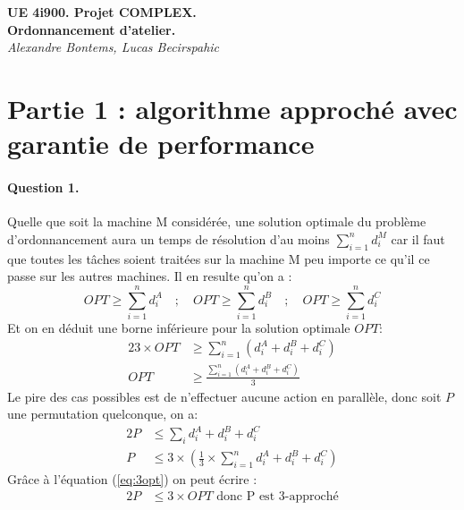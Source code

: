 \documentclass[a4paper, 10pt]{article}
\begin{document}
	\begin{center}
		\textbf{UE 4i900. Projet COMPLEX.}\\
		\textbf{Ordonnancement d'atelier.}\\[0.5cm]
		\textit{Alexandre Bontems, Lucas Becirspahic}
	\end{center}
	
	\section*{Partie 1 : algorithme approché avec garantie de performance}
	
	\paragraph{Question 1.}{Quelle que soit la machine M considérée, une solution optimale du problème d'ordonnancement aura un temps de résolution d'au moins $\sum_{i=1}^nd_i^M$ car il faut que toutes les tâches soient traitées sur la machine M peu importe ce qu'il ce passe sur les autres machines. Il en resulte qu'on a :
		\begin{equation*}
			OPT \geq \sum_{i=1}^nd_i^A \quad ; \quad OPT \geq \sum_{i=1}^nd_i^B \quad ; \quad OPT \geq \sum_{i=1}^nd_i^C
		\end{equation*}
          Et on en déduit une borne inférieure pour la solution optimale $OPT$:
          \begin{alignat}{2}
          	3 \times OPT &\geq \sum_{i=1}^n(d_i^A + d_i^B + d_i^C) \nonumber \\ 
          	\label{eq:3opt}
          	OPT &\geq \frac{\sum_{i=1}^n \left( d_i^A + d_i^B + d_i^C \right)}{3} 
          \end{alignat}
		Le pire des cas possibles est de n'effectuer aucune action en parallèle, donc soit $P$ une permutation quelconque, on a:
		\begin{alignat*}{2}
			P &\le \sum_{i} d_i^A + d_i^B + d_i^C \\
			P &\le 3 \times \left( \frac{1}{3} \times \sum_{i=1}^n d_i^A + d_i^B + d_i^C \right)
		\end{alignat*}
		Grâce à l'équation (\ref{eq:3opt}) on peut écrire :
		\begin{alignat*}{2}
			P &\leq 3 \times OPT \text{ donc P est 3-approché}
		\end{alignat*}}
		
\end{document}
